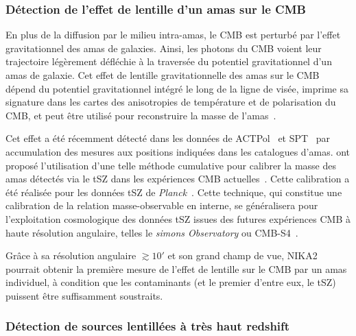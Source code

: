 \subsubsection{Détection de l'effet de lentille d'un amas sur le CMB}

En plus de la diffusion par le milieu intra-amas, le CMB est perturbé
par l'effet gravitationnel des amas de galaxies. Ainsi, les photons du
CMB voient leur trajectoire légèrement défléchie à la traversée du
potentiel gravitationnel d'un amas de galaxie. Cet effet de lentille
gravitationnelle des amas sur le CMB dépend du potentiel gravitationnel
intégré le long de la ligne de visée, imprime sa signature dans les
cartes des anisotropies de température et de polarisation du CMB, et
peut être utilisé pour reconstruire la masse de
l'amas~\citep{Seljak2000, Hu2007}.

Cet effet a été récemment détecté dans les données de
ACTPol~\citep{Madhavacheril2015} et SPT~\citep{Baxter2015} par
accumulation des mesures aux positions indiquées dans les catalogues
d'amas. \citet{Melin2015} ont proposé l'utilisation d'une telle méthode
cumulative pour calibrer la masse des amas détectés via le
tSZ  dans les expériences CMB actuelles~\citep{Melin2015}. Cette
calibration a été réalisée pour les données tSZ de
\emph{Planck}~\citep{Planck_2016_SZ_cosmo, Zulbedia2019}. 
Cette technique, qui constitue une calibration de la relation
masse-observable en interne, se généralisera pour l'exploitation
cosmologique des données tSZ issues des futures expériences CMB à
haute résolution angulaire, telles le \emph{simons Observatory} ou
CMB-S4~\citep{Louis2017}.

Grâce à sa résolution angulaire $\gtrsim 10'$ et son grand champ de
vue, NIKA2 pourrait obtenir la première mesure de l'effet de lentille
sur le CMB par un amas individuel, à condition que les contaminants (et
le premier d'entre eux, le tSZ) puissent être suffisamment soustraits. 

\subsubsection{Détection de sources lentillées à très haut redshift}

